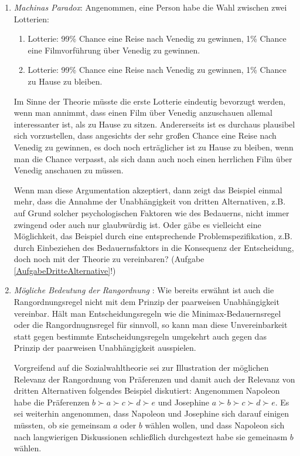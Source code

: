 \begin{enumerate}
  \item {\em Machinas Paradox}:
\label{machinasParadox}
Angenommen, eine Person habe die Wahl zwischen zwei Lotterien:
\begin{enumerate}
  \item Lotterie: 99\% Chance eine Reise nach Venedig zu gewinnen, 1\%
  Chance eine Filmvorführung über Venedig zu gewinnen.
  \item Lotterie: 99\% Chance eine Reise nach Venedig zu gewinnen, 1\%
  Chance zu Hause zu bleiben.
\end{enumerate}
Im Sinne der Theorie müsste die erste Lotterie eindeutig bevorzugt werden, wenn
man annimmt, dass einen Film über Venedig anzuschauen allemal interessanter
ist, als zu Hause zu sitzen. Andererseits ist es durchaus plausibel sich
vorzustellen, dass angesichts der sehr großen Chance eine Reise nach Venedig zu
gewinnen, es doch noch erträglicher ist zu Hause zu bleiben, wenn man
die Chance verpasst, als sich dann auch noch einen herrlichen Film über Venedig
anschauen zu müssen. 

Wenn man diese Argumentation akzeptiert, dann zeigt das Beispiel einmal mehr,
dass die Annahme der Unabhängigkeit von dritten Alternativen, z.B. auf Grund
solcher psychologischen Faktoren wie des Bedauerns, nicht immer zwingend oder
auch nur glaubwürdig ist. Oder gäbe es vielleicht eine Möglichkeit, das Beispiel
durch eine entsprechende Problemspezifikation, z.B. durch Einbeziehen des Bedauernsfaktors
in die Konsequenz der Entscheidung, doch noch mit der Theorie zu vereinbaren?
(Aufgabe \ref{AufgabeDritteAlternative}!)

\item {\em Mögliche Bedeutung der Rangordnung} \cite[S. 81]{mackie:2003}: Wie
bereits erwähnt ist auch die Rangordnungsregel nicht mit dem Prinzip der
paarweisen Unabhängigkeit vereinbar. Hält man Entscheidungsregeln wie die
Minimax-Bedauernsregel oder die Rangordnugnsregel für sinnvoll, so kann man diese
Unvereinbarkeit statt gegen bestimmte Entscheidungsregeln umgekehrt auch gegen
das Prinzip der paarweisen Unabhängigkeit ausspielen. 

Vorgreifend auf die Sozialwahltheorie sei zur Illustration der möglichen Relevanz
der Rangordnung von Präferenzen und damit auch der Relevanz von dritten
Alternativen folgendes Beispiel diskutiert: Angenommen Napoleon habe die
Präferenzen $b \succ a \succ c \succ d \succ e$ und Josephine $a \succ b \succ c
\succ d \succ e$. Es sei weiterhin angenommen, dass Napoleon und Josephine sich
darauf einigen müssten, ob sie gemeinsam $a$ oder $b$ wählen wollen, und dass
Napoleon sich nach langwierigen Diskussionen schließlich durchgestezt habe sie
gemeinasm $b$ wählen.


\end{enumerate}
